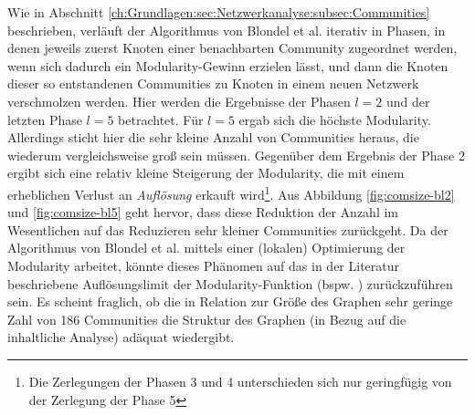 Wie in Abschnitt
\ref{ch:Grundlagen:sec:Netzwerkanalyse:subsec:Communities}
beschrieben, verläuft der Algorithmus von Blondel et al. iterativ in
Phasen, in denen jeweils zuerst Knoten einer benachbarten Community
zugeordnet werden, wenn sich dadurch ein Modularity-Gewinn erzielen
lässt, und dann die Knoten dieser so entstandenen Communities zu
Knoten in einem neuen Netzwerk verschmolzen werden. Hier werden die
Ergebnisse der Phasen $l=2$ und der letzten Phase $l=5$
betrachtet. Für $l=5$ ergab sich die höchste
Modularity. Allerdings sticht hier die sehr kleine Anzahl von
Communities heraus, die wiederum vergleichsweise groß sein
müssen. Gegenüber dem Ergebnis der Phase 2 ergibt sich eine
relativ kleine Steigerung der Modularity, die mit einem erheblichen
Verlust an \emph{Auflösung} erkauft wird\footnote{Die Zerlegungen
  der Phasen 3 und 4 unterschieden sich nur geringfügig von der
  Zerlegung der Phase 5}. Aus Abbildung \ref{fig:comsize-bl2} und
\ref{fig:comsize-bl5} geht hervor, dass diese Reduktion der Anzahl im
Wesentlichen auf das Reduzieren sehr kleiner Communities
zurückgeht. Da der Algorithmus von Blondel et al. 
mittels einer (lokalen) Optimierung der Modularity arbeitet,
könnte dieses Phänomen auf das in der Literatur beschriebene
Auflösungslimit der Modularity-Funktion (bspw. \cite{Fortunato2007}
\cite{Good2009}) zurückzuführen sein. Es scheint fraglich, ob die
in Relation zur Größe des Graphen sehr geringe Zahl von 186
Communities die Struktur des Graphen (in Bezug auf die inhaltliche
Analyse) adäquat wiedergibt.

